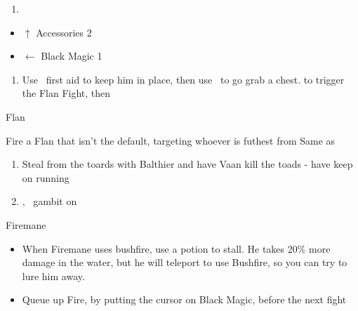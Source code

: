 \begin{enumerate}
	\item \cs
\end{enumerate}
\begin{liscense}
	\begin{itemize}
		\vaanf
		\begin{itemize}
			\item $\uparrow$ Accessories 2
			\item $\leftarrow$ Black Magic 1
		\end{itemize}
	\end{itemize}
\end{liscense}
\begin{gambit}
	\begin{itemize}
	\end{itemize}
\end{gambit}
\begin{enumerate}
	\item Use \balthier\ first aid to keep him in place, then use \fran\ to go grab a chest. \leader{\balthier} to trigger the Flan Fight, then \leader{\fran}
\end{enumerate}
\begin{battle}{Flan}
	\begin{itemize}
		\franf Fire a Flan that isn't the default, targeting whoever is futhest from \ashe
		\vaanf Same as \fran
	\end{itemize}
\end{battle}
\begin{enumerate}
	\item Steal from the toards with Balthier and have Vaan kill the toads - have \fran keep on running
	\item \leader{\balthier}, \fran\ gambit on
\end{enumerate}

\begin{battle}{Firemane}
	\begin{itemize}
		\vaanf Attack
		\balthierf Attack
		\item When Firemane uses bushfire, use a potion to stall. He takes 20\% more damage in the water, but he will teleport to use Bushfire, so you can try to lure him away.
		\item Queue up Fire, by putting the cursor on Black Magic, before the next fight
	\end{itemize}
\end{battle}
